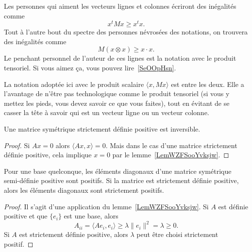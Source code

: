 Les personnes qui aiment les vecteurs lignes et colonnes écriront des inégalités comme
\begin{equation}
    x^tMx\geq x^tx.
\end{equation}
Tout à l'autre bout du spectre des personnes névrosées des notations, on trouvera des inégalités comme
\begin{equation}
    M(x\otimes x)\geq x\cdot x.
\end{equation}
Le penchant personnel de l'auteur de ces lignes est la notation avec le produit tensoriel. Si vous aimez ça, vous pouvez lire~\ref{SeOOpHsn}.

La notation adoptée ici avec le produit scalaire \( \langle x, Mx\rangle \) est entre les deux. Elle a l'avantage de n'être pas technologique comme le produit tensoriel (si vous y mettez les pieds, vous devez savoir ce que vous faites), tout en évitant de se casser la tête à savoir qui est un vecteur ligne ou un vecteur colonne.

\begin{corollary}
    Une matrice symétrique strictement définie positive est inversible.
\end{corollary}

\begin{proof}
    Si \( Ax=0\) alors \( \langle Ax, x\rangle =0\). Mais dans le cas d'une matrice strictement définie positive, cela implique \( x=0\) par le lemme~\ref{LemWZFSooYvksjw}.
\end{proof}

\begin{lemma}
    Pour une base quelconque, les éléments diagonaux d'une matrice symétrique semi-définie positive sont positifs. Si la matrice est strictement définie positive, alors les éléments diagonaux sont strictement positifs.
\end{lemma}

\begin{proof}
    Il s'agit d'une application du lemme~\ref{LemWZFSooYvksjw}. Si \( A\) est définie positive et que \( \{ e_i \}\) est une base, alors
    \begin{equation}
        A_{ii}=\langle Ae_i, e_i\rangle \geq \lambda\| e_i \|^2=\lambda\geq 0.
    \end{equation}
    Si \( A\) est strictement définie positive, alors \( \lambda\) peut être choisi strictement positif.
\end{proof}

